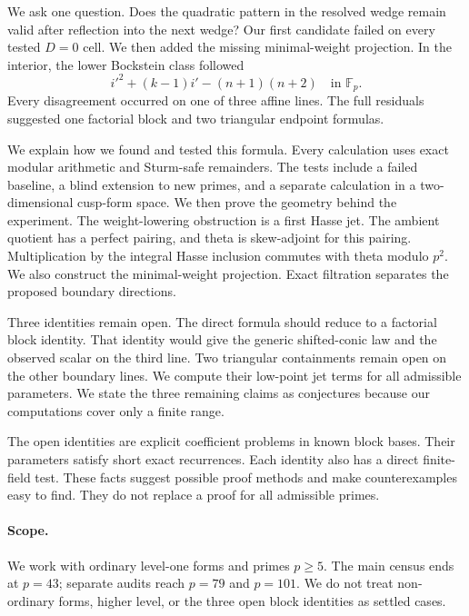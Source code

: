 \documentclass[11pt]{article}
\theoremstyle{remark}
\begin{document}
We ask one question.  Does the quadratic pattern in the resolved wedge remain
valid after reflection into the next wedge?  Our first candidate failed on
every tested $D=0$ cell.  We then added the missing minimal-weight projection.
In the interior, the lower Bockstein class followed
\begin{equation}\label{eq:intro-shifted-conic-experimental}
 i'^2+(k-1)i'-(n+1)(n+2)\quad\text{in }\mathbb F_p.
\end{equation}
Every disagreement occurred on one of three affine lines.  The full residuals
suggested one factorial block and two triangular endpoint formulas.

We explain how we found and tested this formula.  Every calculation uses
exact modular arithmetic and Sturm-safe remainders.  The tests include a
failed baseline, a blind extension to new primes, and a separate calculation
in a two-dimensional cusp-form space.  We then prove the geometry behind the
experiment.  The weight-lowering obstruction is a first Hasse jet.  The
ambient quotient has a perfect pairing, and theta is skew-adjoint for this
pairing.  Multiplication by the integral Hasse inclusion commutes with theta
modulo $p^2$.  We also construct the minimal-weight projection.  Exact
filtration separates the proposed boundary directions.

Three identities remain open.  The direct formula should reduce to a
factorial block identity.  That identity would give the generic
shifted-conic law and the observed scalar on the third line.  Two triangular
containments remain open on the other boundary lines.  We compute their
low-point jet terms for all admissible parameters.  We state the three
remaining claims as conjectures because our computations cover only a finite
range.

The open identities are explicit coefficient problems in known block bases.
Their parameters satisfy short exact recurrences.  Each identity also has a
direct finite-field test.  These facts suggest possible proof methods and
make counterexamples easy to find.  They do not replace a proof for all
admissible primes.

\paragraph{Scope.}
We work with ordinary level-one forms and primes $p\geq5$.  The main census
ends at $p=43$; separate audits reach $p=79$ and $p=101$.  We do not treat
non-ordinary forms, higher level, or the three open block identities as
settled cases.
\end{document}
